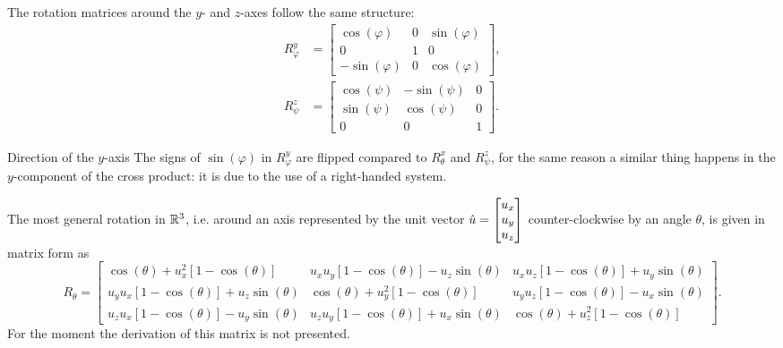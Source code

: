 The rotation matrices around the $y$- and $z$-axes follow the same structure:
\begin{align}
	R^{y}_{\varphi} &=
		\begin{bmatrix}
			\cos \left( \varphi \right) & 0 & \sin \left( \varphi \right)\\
			0 & 1 & 0 \\
			-\sin \left( \varphi \right) & 0 & \cos \left( \varphi \right)
		\end{bmatrix},\\
	R^{z}_{\psi} &=
		\begin{bmatrix}
			\cos \left( \psi \right) & -\sin \left( \psi \right) & 0\\
			\sin \left( \psi \right) & \cos \left( \psi \right)  & 0\\
			0 & 0 & 1
		\end{bmatrix}.
	\label{eq:rotation_y_z}
\end{align}

\begin{note}{Direction of the $y$-axis}{}
	The signs of $\sin \left( \varphi \right)$ in $R^{y}_{\varphi}$ are flipped compared to $R^{x}_{\theta}$ and $R^{z}_{\psi}$, for the same reason a similar thing happens in the $y$-component of the cross product: it is due to the use of a right-handed system.
\end{note}

The most general rotation in $\mathbb{R}^{3}$, i.e. around an axis represented by the unit vector $\hat{u}=\colvec{u_{x};u_{y};u_{z}}$ counter-clockwise by an angle $\theta$, is given in matrix form as
\begin{equation}
	R_{\theta}=
	\begin{bmatrix}
		\cos \left( \theta \right) +u_{x}^{2}\left[1-\cos \left( \theta \right) \right] & u_{x}u_{y}\left[1-\cos \left( \theta \right) \right]-u_{z}\sin \left( \theta \right)  & u_{x}u_{z}\left[1-\cos \left( \theta \right) \right]+u_{y}\sin \left( \theta \right) \\
		u_{y}u_{x}\left[1-\cos \left( \theta \right) \right]+u_{z}\sin \left( \theta \right)  & \cos \left( \theta \right) +u_{y}^{2}\left[1-\cos \left( \theta \right) \right] & u_{y}u_{z}\left[1-\cos \left( \theta \right) \right]-u_{x}\sin \left( \theta \right) \\
		u_{z}u_{x}\left[1-\cos \left( \theta \right) \right]-u_{y}\sin \left( \theta \right)  & u_{z}u_{y}\left[1-\cos \left( \theta \right) \right]+u_{x}\sin \left( \theta \right)  & \cos \left( \theta \right) +u_{z}^{2}\left[1-\cos \left( \theta \right) \right]\end{bmatrix}.
	\label{eq:}
\end{equation}
For the moment the derivation of this matrix is not presented.


